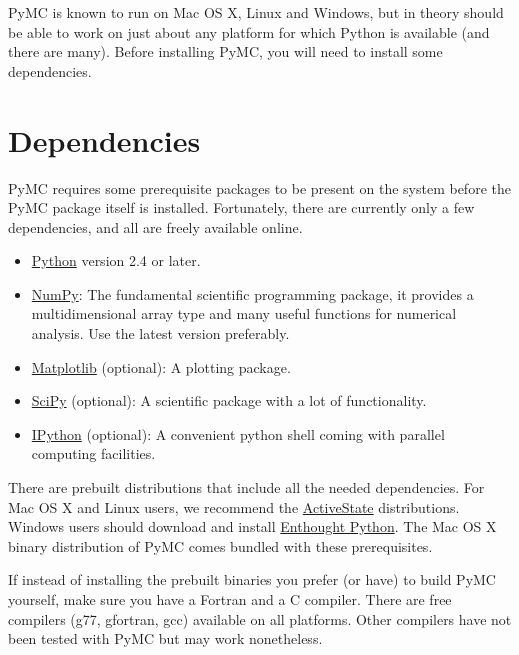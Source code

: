 


PyMC is known to run on Mac OS X, Linux and Windows, but in theory should be
able to work on just about any platform for which Python is available (and
there are many). Before installing PyMC, you will need to install some
dependencies.



\hypertarget{dependencies}{}
\section*{Dependencies}
\label{dependencies}

PyMC requires some prerequisite packages to be present on the system before the
PyMC package itself is installed. Fortunately, there are currently only a few
dependencies, and all are freely available online.
\begin{itemize}
\item {} 
\href{http://www.python.org/.}{Python} version 2.4 or later.

\item {} 
\href{http://www.scipy.org/NumPy}{NumPy}: The fundamental scientific programming package, it provides a
multidimensional array type and many useful functions for numerical analysis.
Use the latest version preferably.

\item {} 
\href{http://matplotlib.sourceforge.net/}{Matplotlib} (optional): A plotting package.

\item {} 
\href{http://www.scipy.org/}{SciPy} (optional): A scientific package with a lot of functionality.

\item {} 
\href{http://ipython.scipy.org/}{IPython} (optional): A convenient python shell coming with parallel
computing facilities.

\end{itemize}

There are prebuilt distributions that include all the needed dependencies. For
Mac OS X and Linux users, we recommend the \href{http://www.activestate.com/Products/ActivePython/}{ActiveState} distributions.
Windows users should download and install \href{http://code.enthought.com/enthon/}{Enthought Python}. The Mac OS X
binary distribution of PyMC comes bundled with these prerequisites.

If instead of installing the prebuilt binaries you prefer (or have) to build PyMC
yourself, make sure you have a Fortran and a C compiler. There are free
compilers (g77, gfortran, gcc) available on all platforms. Other compilers have not been
tested with PyMC but may work nonetheless.

